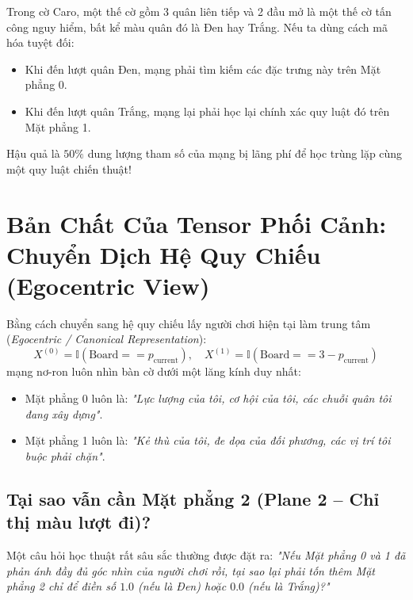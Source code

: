 \documentclass[11pt,a4paper]{report}
\begin{document}
Trong cờ Caro, một thế cờ gồm 3 quân liên tiếp và 2 đầu mở là một thế cờ tấn công nguy hiểm, bất kể màu quân đó là Đen hay Trắng. Nếu ta dùng cách mã hóa tuyệt đối:
\begin{itemize}
    \item Khi đến lượt quân Đen, mạng phải tìm kiếm các đặc trưng này trên Mặt phẳng 0.
    \item Khi đến lượt quân Trắng, mạng lại phải học lại chính xác quy luật đó trên Mặt phẳng 1.
\end{itemize}
Hậu quả là $50\%$ dung lượng tham số của mạng bị lãng phí để học trùng lặp cùng một quy luật chiến thuật!

\section{Bản Chất Của Tensor Phối Cảnh: Chuyển Dịch Hệ Quy Chiếu (Egocentric View)}

Bằng cách chuyển sang hệ quy chiếu lấy người chơi hiện tại làm trung tâm (\textit{Egocentric / Canonical Representation}):
\begin{equation}
    X^{(0)} = \mathbb{I}(\text{Board} == p_{\text{current}}), \quad X^{(1)} = \mathbb{I}(\text{Board} == 3 - p_{\text{current}})
\end{equation}
mạng nơ-ron luôn nhìn bàn cờ dưới một lăng kính duy nhất:
\begin{itemize}
    \item Mặt phẳng 0 luôn là: \textit{"Lực lượng của tôi, cơ hội của tôi, các chuỗi quân tôi đang xây dựng"}.
    \item Mặt phẳng 1 luôn là: \textit{"Kẻ thù của tôi, đe dọa của đối phương, các vị trí tôi buộc phải chặn"}.
\end{itemize}

\subsection{Tại sao vẫn cần Mặt phẳng 2 (Plane 2 -- Chỉ thị màu lượt đi)?}
Một câu hỏi học thuật rất sâu sắc thường được đặt ra: \textit{"Nếu Mặt phẳng 0 và 1 đã phản ánh đầy đủ góc nhìn của người chơi rồi, tại sao lại phải tốn thêm Mặt phẳng 2 chỉ để điền số $1.0$ (nếu là Đen) hoặc $0.0$ (nếu là Trắng)?"}
\end{document}

